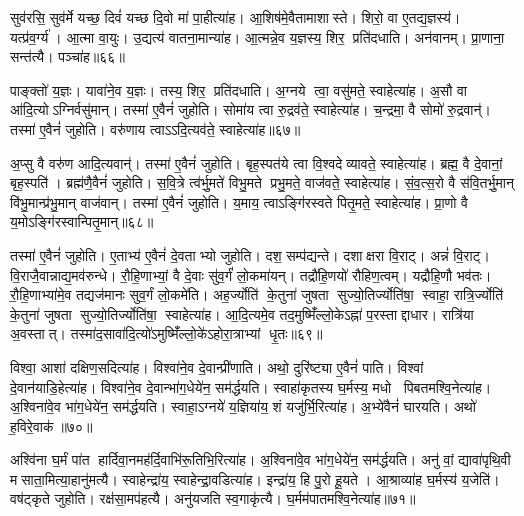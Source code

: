 सुव॑रसि॒ सुव॑र्मे यच्छ॒ दिवं॑ यच्छ दि॒वो मा॑ पा॒हीत्या॑ह। 
आ॒शिष॑मे॒वैतामाशास्ते। 
शिरो॒ वा ए॒तद्य॒ज्ञस्य॑। 
यत्प्र॑व॒र्ग्य॑। 
आ॒त्मा वा॒युः। 
उ॒द्यत्य॑ वातना॒मान्या॑ह। 
आ॒त्मन्ने॒व य॒ज्ञस्य॒ शिर॒ प्रति॑दधाति। 
अन॑वानम्। 
प्रा॒णाना॒ सन्त॑त्यै। 
पञ्चा॑ह॥६६॥

पाङ्क्तो॑ य॒ज्ञः। 
यावा॑ने॒व य॒ज्ञः। 
तस्य॒ शिर॒ प्रति॑दधाति। 
अ॒ग्नये त्वा॒ वसु॑मते॒ स्वाहेत्या॑ह। 
अ॒सौ वा आ॑दि॒त्योऽग्निर्वसु॑मान्। 
तस्मा॑ ए॒वैनं॑ जुहोति। 
सोमा॑य त्वा रु॒द्रव॑ते॒ स्वाहेत्या॑ह। 
च॒न्द्रमा॒ वै सोमो॑ रु॒द्रवान्॑। 
तस्मा॑ ए॒वैनं॑ जुहोति। 
वरु॑णाय त्वाऽऽदि॒त्यव॑ते॒ स्वाहेत्या॑ह॥६७॥

अ॒प्सु वै वरु॑ण आदि॒त्यवान्॑। 
तस्मा॑ ए॒वैनं॑ जुहोति। 
बृह॒स्पत॑ये त्वा वि॒श्वदेव्यावते॒ स्वाहेत्या॑ह। 
ब्रह्म॒ वै दे॒वानां॒ बृह॒स्पति॑। 
ब्रह्म॑णै॒वैनं॑ जुहोति। 
स॒वि॒त्रे त्व॑र्भु॒मते॑ विभु॒मते प्रभु॒मते॒ वाज॑वते॒ स्वाहेत्या॑ह। 
सं॒व॒त्स॒रो वै स॑वि॒तर्भु॒मान् वि॑भु॒मान्प्र॑भु॒मान् वाज॑वान्। 
तस्मा॑ ए॒वैनं॑ जुहोति। 
य॒माय॒ त्वाऽङ्गि॑रस्वते पितृ॒मते॒ स्वाहेत्या॑ह। 
प्रा॒णो वै य॒मोऽङ्गि॑रस्वान्पितृ॒मान्॥६८॥

तस्मा॑ ए॒वैनं॑ जुहोति। 
ए॒ताभ्य॑ ए॒वैनं॑ दे॒वताभ्यो जुहोति। 
दश॒ सम्प॑द्यन्ते। 
दशाक्षरा वि॒राट्। 
अन्नं॑  वि॒राट्। 
वि॒राजै॒वान्नाद्य॒मव॑रुन्धे। 
रौ॒हि॒णाभ्यां॒ वै दे॒वाः सु॑व॒र्गं॑ लो॒कमा॑यन्। 
तद्रौ॑हि॒णयो॑ रौहिण॒त्वम्। 
यद्रौ॑हि॒णौ भव॑तः। 
रौ॒हि॒णाभ्या॑मे॒व तद्यज॑मानः सुव॒र्गं लो॒कमे॑ति। 
अह॒र्ज्योति॑ के॒तुना॑ जुषता सुज्यो॒तिर्ज्योति॑षा॒ स्वाहा॒ रात्रि॒र्ज्योति॑ के॒तुना॑ जुषता सुज्यो॒तिर्ज्योति॑षा॒ स्वाहेत्या॑ह। 
आ॒दि॒त्यमे॒व तद॒मुष्मिँ॑ल्लो॒केऽह्ना॑ प॒रस्ताद्दाधार। 
रात्रि॑या अ॒वस्तात्। 
तस्मा॑द॒सावा॑दि॒त्यो॑ऽमुष्मिँ॑ल्लो॒के॑ऽहोरा॒त्राभ्यां धृ॒तः॥६९॥
\anuvakamend[म॒नु॒ष्य॒ना॒मानि॑ प॒शव॑ सीद॒त्वित्या॒हेन्द्रा॒येत्या॑हार्द्धयति घ्नन्ति गृह्णा॒त्यहिसायै॒ पञ्चा॑ऽहादि॒त्यव॑ते॒ स्वाहेत्या॑ह पितृ॒माने॑ति च॒त्वारि॑ च]

विश्वा॒ आशा॑ दक्षिण॒सदित्या॑ह। 
विश्वा॑ने॒व दे॒वान्प्री॑णाति। 
अथो॒ दुरि॑ष्ट्या ए॒वैनं॑ पाति। 
विश्वां दे॒वान॑याडि॒हेत्या॑ह। 
विश्वा॑ने॒व दे॒वान्भा॑ग॒धेये॑न॒ सम॑र्द्धयति। 
स्वाहा॑कृतस्य घ॒र्मस्य॒ मधो पिबतमश्वि॒नेत्या॑ह। 
अ॒श्विना॑वे॒व भा॑ग॒धेये॑न॒ सम॑र्द्धयति। 
स्वाहा॒ऽग्नये॑ य॒ज्ञिया॑य॒ शं यजु॑र्भि॒रित्या॑ह। 
अ॒भ्ये॑वैनं॑ घारयति। 
अथो॑ ह॒विरे॒वाक॑॥७०॥

अश्वि॑ना घ॒र्मं पा॑त हार्दिवा॒नमह॑र्दि॒वाभि॑रू॒तिभि॒रित्या॑ह। 
अ॒श्विना॑वे॒व भा॑ग॒धेये॑न॒ सम॑र्द्धयति। 
अनु॑ वां॒ द्यावा॑पृथि॒वी मसाता॒मित्या॒हानु॑मत्यै। 
स्वाहेन्द्रा॑य॒ स्वाहेन्द्रा॒वडित्या॑ह। 
इन्द्रा॑य॒ हि पु॒रो हू॒यते। 
आ॒श्राव्या॑ह घ॒र्मस्य॑ य॒जेति॑। 
वष॑ट्कृते जुहोति। 
रक्ष॑सा॒मप॑हत्यै। 
अनु॑यजति स्व॒गाकृ॑त्यै। 
घ॒र्मम॑पातमश्वि॒नेत्या॑ह॥७१॥

